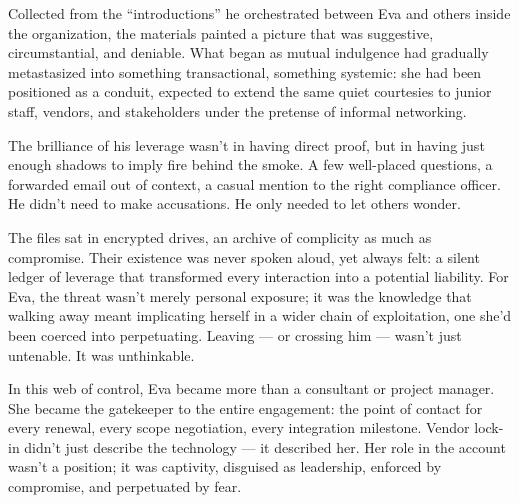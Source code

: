 Collected from the “introductions” he orchestrated between Eva and others inside the organization, the materials painted a picture that was suggestive, circumstantial, and deniable. What began as mutual indulgence had gradually metastasized into something transactional, something systemic: she had been positioned as a conduit, expected to extend the same quiet courtesies to junior staff, vendors, and stakeholders under the pretense of informal networking.

The brilliance of his leverage wasn’t in having direct proof, but in having just enough shadows to imply fire behind the smoke. A few well-placed questions, a forwarded email out of context, a casual mention to the right compliance officer. He didn’t need to make accusations. He only needed to let others wonder.

The files sat in encrypted drives, an archive of complicity as much as compromise. Their existence was never spoken aloud, yet always felt: a silent ledger of leverage that transformed every interaction into a potential liability. For Eva, the threat wasn’t merely personal exposure; it was the knowledge that walking away meant implicating herself in a wider chain of exploitation, one she’d been coerced into perpetuating. Leaving --- or crossing him --- wasn’t just untenable. It was unthinkable.

In this web of control, Eva became more than a consultant or project manager. She became the gatekeeper to the entire engagement: the point of contact for every renewal, every scope negotiation, every integration milestone. Vendor lock-in didn’t just describe the technology --- it described her. Her role in the account wasn’t a position; it was captivity, disguised as leadership, enforced by compromise, and perpetuated by fear.

\medskip

